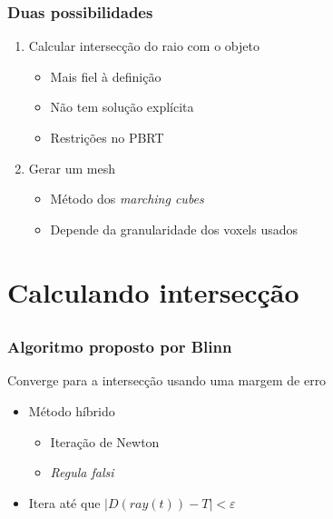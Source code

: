 \documentclass[brazil]{beamer}
\begin{document}
      \begin{frame}
        \frametitle{Duas possibilidades}
        \begin{enumerate}
          \item
            Calcular intersecção do raio com o objeto
            \begin{itemize}
              \item Mais fiel à definição
              \item Não tem solução explícita
              \item Restrições no PBRT
            \end{itemize}
          \vspace{1em}
          \pause
          \item Gerar um mesh
            \begin{itemize}
              \item Método dos \textit{marching cubes}
              \item Depende da granularidade dos voxels usados
            \end{itemize}
        \end{enumerate}
      \end{frame}
      
  \section{Calculando intersecção}
  
    \subsection{}
    
      \begin{frame}
        \frametitle{Algoritmo proposto por Blinn}
          Converge para a intersecção usando uma margem de erro
          \begin{itemize}
            \item
              Método híbrido
              \begin{itemize}
                \item Iteração de Newton
                \item \textit{Regula falsi}
              \end{itemize}
            \item
              Itera até que $| D(ray(t)) - T | < \varepsilon $ 
          \end{itemize}
      \end{frame}
      
\end{document}
